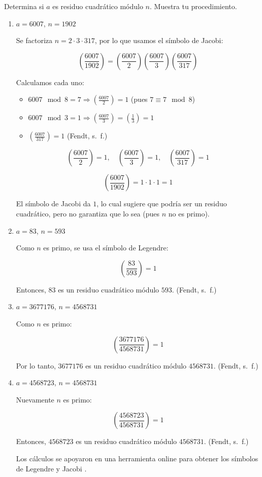 Determina si $a$ es residuo cuadrático módulo $n$. Muestra tu procedimiento.

\begin{enumerate}
    \item $a = 6007$, $n=1902$
    
    Se factoriza $n = 2 \cdot 3 \cdot 317$, por lo que usamos el símbolo de Jacobi:

    \[
    \left( \frac{6007}{1902} \right) = \left( \frac{6007}{2} \right) \left( \frac{6007}{3} \right) \left( \frac{6007}{317} \right)
    \]

    Calculamos cada uno:
    \begin{itemize}
    \item $6007 \mod 8 = 7 \Rightarrow \left( \frac{6007}{2} \right) = 1$ (pues $7 \equiv 7 \mod 8$)
    \item $6007 \mod 3 = 1 \Rightarrow \left( \frac{6007}{3} \right) = \left( \frac{1}{3} \right) = 1$
    \item $\left( \frac{6007}{317} \right) = 1$ (Fendt, s. f.)
    \end{itemize}


    \[
    \left( \frac{6007}{2} \right) = 1, \quad \left( \frac{6007}{3} \right) = 1, \quad \left( \frac{6007}{317} \right) = 1
    \]

    \[
    \left( \frac{6007}{1902} \right) = 1 \cdot 1 \cdot 1 = 1
    \]

    El símbolo de Jacobi da $1$, lo cual sugiere que podría ser un residuo cuadrático, pero no garantiza que lo sea (pues $n$ no es primo).

        \item $a=83$, $n=593$
        
        Como $n$ es primo, se usa el símbolo de Legendre:

        \[
    \left( \frac{83}{593} \right) = 1
    \]

    Entonces, $83$ es un residuo cuadrático módulo $593$. (Fendt, s. f.)

    \item $a=3677176$, $n=4568731$
    
    Como $n$ es primo:

    \[
    \left( \frac{3677176}{4568731} \right) = 1
    \]

    Por lo tanto, $3677176$ es un residuo cuadrático módulo $4568731$. (Fendt, s. f.)

    \item $a=4568723$, $n=4568731$
    
    Nuevamente $n$ es primo:

    \[
    \left( \frac{4568723}{4568731} \right) = 1
    \]

    Entonces, $4568723$ es un residuo cuadrático módulo $4568731$. (Fendt, s. f.)

    Los cálculos se apoyaron en una herramienta online para obtener los símbolos de Legendre y Jacobi \cite{fendt_legendre}.

\end{enumerate}